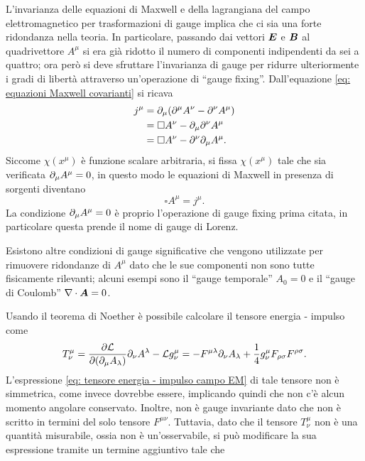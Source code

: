 L'invarianza delle equazioni di Maxwell e della lagrangiana del campo elettromagnetico per trasformazioni di gauge implica che ci sia una forte ridondanza nella teoria. In particolare, passando dai vettori $\bm{E}$ e $\bm{B}$ al quadrivettore $A^\mu$ si era già ridotto il numero di componenti indipendenti da sei a quattro; ora però si deve sfruttare l'invarianza di gauge per ridurre ulteriormente i gradi di libertà attraverso un'operazione di ``gauge fixing''. Dall'equazione \eqref{eq: equazioni Maxwell covarianti} si ricava
\begin{equation}
    \begin{split}
        j^\mu &= \partial_\mu(\partial^\mu A^\nu - \partial^\nu A^\mu)\\
        &= \square A^\nu - \partial_\mu\partial^\nu A^\mu\\
        &= \square A^\nu - \partial^\nu\partial_\mu A^\mu.
    \end{split} 
\end{equation}
Siccome $\chi(x^\mu)$ è funzione scalare arbitraria, si fissa $\chi(x^\mu)$ tale che sia verificata $\partial_\mu A^\mu = 0$, in questo modo le equazioni di Maxwell in presenza di sorgenti diventano
\begin{equation}
\label{eq: equazioni di Maxwell gauge Lorenz}
    \square A^\mu = j^\mu.
\end{equation}
La condizione $\partial_\mu A^\mu = 0$ è proprio l'operazione di gauge fixing prima citata, in particolare questa prende il nome di gauge di Lorenz.  
\begin{obs}
    Esistono altre condizioni di gauge significative che vengono utilizzate per rimuovere ridondanze di $A^\mu$ dato che le sue componenti non sono tutte fisicamente rilevanti; alcuni esempi sono il ``gauge temporale'' $A_0 = 0$ e il ``gauge di Coulomb'' $\nabla\cdot\bm{A} = 0$.
\end{obs}
Usando il teorema di Noether è possibile calcolare il tensore energia - impulso come
\begin{equation}
\label{eq: tensore energia - impulso campo EM}
    T^\mu_\nu = \frac{\partial\mathcal{L}}{\partial(\partial_\mu A_\lambda)}\partial_\nu A^\lambda - \mathcal{L} g^\mu_\nu = -F^{\mu\lambda}\partial_\nu A_\lambda + \frac{1}{4}g^\mu_\nu F_{\rho\sigma}F^{\rho\sigma}.
\end{equation}
L'espressione \eqref{eq: tensore energia - impulso campo EM} di tale tensore non è simmetrica, come invece dovrebbe essere, implicando quindi che non c'è alcun momento angolare conservato. Inoltre, non è gauge invariante dato che non è scritto in termini del solo tensore $F^{\mu\nu}$. Tuttavia, dato che il tensore $T^\mu_\nu$ non è una quantità misurabile, ossia non è un'osservabile, si può modificare la sua espressione tramite un termine aggiuntivo tale che
